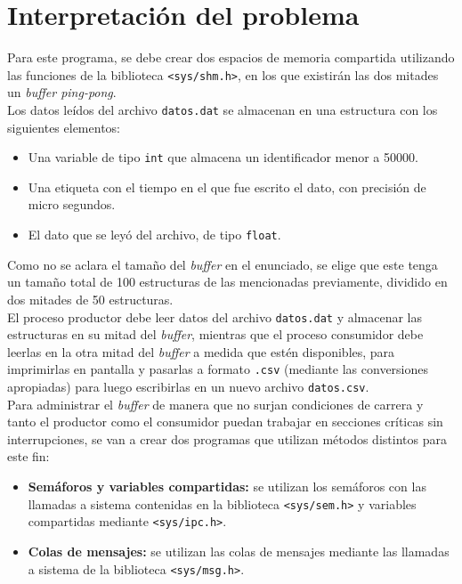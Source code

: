 \section{Interpretación del problema}
Para este programa, se debe crear dos espacios de memoria compartida utilizando las funciones de la biblioteca \texttt{<sys/shm.h>}, en los que existirán las dos mitades un \textit{buffer ping-pong}.\\

Los datos leídos del archivo \texttt{datos.dat} se almacenan en una estructura con los siguientes elementos:

\begin{itemize}
    \item Una variable de tipo \texttt{int} que almacena un identificador menor a 50000.
    \item Una etiqueta con el tiempo en el que fue escrito el dato, con precisión de micro segundos.
    \item El dato que se leyó del archivo, de tipo \texttt{float}.\\
\end{itemize}

Como no se aclara el tamaño del \textit{buffer} en el enunciado, se elige que este tenga un tamaño total de 100 estructuras de las mencionadas previamente, dividido en dos mitades de 50 estructuras.\\

El proceso productor debe leer datos del archivo \texttt{datos.dat} y almacenar las estructuras en su mitad del \textit{buffer}, mientras que el proceso consumidor debe leerlas en la otra mitad del \textit{buffer} a medida que estén disponibles, para imprimirlas en pantalla y pasarlas a formato \texttt{.csv} (mediante las conversiones apropiadas) para luego escribirlas en un nuevo archivo \texttt{datos.csv}.\\

Para administrar el \textit{buffer} de manera que no surjan condiciones de carrera y tanto el productor como el consumidor puedan trabajar en secciones críticas sin interrupciones, se van a crear dos programas que utilizan métodos distintos para este fin:\\

\begin{itemize}
    \item \textbf{Semáforos y variables compartidas:} se utilizan los semáforos con las llamadas a sistema contenidas en la biblioteca \texttt{<sys/sem.h>} y variables compartidas mediante \texttt{<sys/ipc.h>}.
    \item \textbf{Colas de mensajes:} se utilizan las colas de mensajes mediante las llamadas a sistema de la biblioteca \texttt{<sys/msg.h>}.\\
\end{itemize}